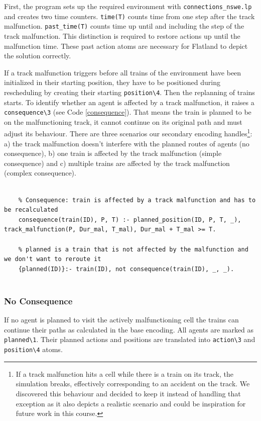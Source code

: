 \documentclass[runningheads]{llncs}
\begin{document}
First, the program sets up the required environment with \verb|connections_nswe.lp| and creates two time counters. \verb|time(T)| counts time from one step after the track malfunction. \verb|past_time(T)| counts time up until and including the step of the track malfunction. This distinction is required to restore actions up until the malfunction time. These past action atoms are necessary for Flatland to depict the solution correctly.

If a track malfunction triggers before all trains of the environment have been initialized in their starting position, they have to be positioned during rescheduling by creating their starting \verb|position\4|. Then the replanning of trains starts. To identify whether an agent is affected by a track malfunction, it raises a \verb|consequence\3| (see Code \ref{consequence}). That means the train is planned to be on the malfunctioning track, it cannot continue on its original path and must adjust its behaviour. There are three scenarios our secondary encoding handles\footnote{If a track malfunction hits a cell while there is a train on its track, the simulation breaks, effectively corresponding to an accident on the track. We discovered this behaviour and decided to keep it instead of handling that exception as it also depicts a realistic scenario and could be inspiration for future work in this course.}: a) the track malfunction doesn't interfere with the planned routes of agents (no consequence), b) one train is affected by the track malfunction (simple consequence) and c) multiple trains are affected by the track malfunction (complex consequence).


\begin{lstlisting}[style=mystyle, language=Clingo, caption={Definition of consequence: if a train is attempting to go into a malfunctioning cell it raises a consequence.}, label={consequence}]
	
	% Consequence: train is affected by a track malfunction and has to be recalculated
	consequence(train(ID), P, T) :- planned_position(ID, P, T, _), track_malfunction(P, Dur_mal, T_mal), Dur_mal + T_mal >= T.

	% planned is a train that is not affected by the malfunction and we don't want to reroute it
	{planned(ID)}:- train(ID), not consequence(train(ID), _, _).
	
\end{lstlisting}


\subsubsection{No Consequence}
If no agent is planned to visit the actively malfunctioning cell the trains can continue their paths as calculated in the base encoding. All agents are marked as \verb|planned\1|. Their planned actions and positions are translated into \verb|action\3| and \verb|position\4| atoms. 
\end{document}
